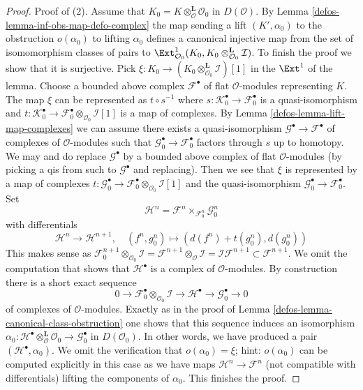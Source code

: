 \begin{proof}
\medskip\noindent
Proof of (2).
Assume that $K_0 = K \otimes_\mathcal{O}^\mathbf{L} \mathcal{O}_0$
in $D(\mathcal{O})$. By Lemma \ref{defos-lemma-inf-obs-map-defo-complex}
the map sending a lift $(K', \alpha_0)$ to the obstruction $o(\alpha_0)$
to lifting $\alpha_0$ defines a canonical injective map
from the set of isomomorphism classes of pairs
to $\Ext^1_{\mathcal{O}_0}(K_0,
K_0 \otimes_{\mathcal{O}_0}^\mathbf{L} \mathcal{I})$.
To finish the proof we show that it is surjective.
Pick $\xi : K_0 \to (K_0 \otimes_{\mathcal{O}_0}^\mathbf{L} \mathcal{I})[1]$
in the $\Ext^1$ of the lemma.
Choose a bounded above complex $\mathcal{F}^\bullet$
of flat $\mathcal{O}$-modules representing $K$.
The map $\xi$ can be represented as $t \circ s^{-1}$
where $s : \mathcal{K}_0^\bullet \to \mathcal{F}_0^\bullet$
is a quasi-isomorphism and
$t : \mathcal{K}_0^\bullet \to
\mathcal{F}_0^\bullet \otimes_{\mathcal{O}_0} \mathcal{I}[1]$
is a map of complexes.
By Lemma \ref{defos-lemma-lift-map-complexes}
we can assume there exists a quasi-isomorphism
$\mathcal{G}^\bullet \to \mathcal{F}^\bullet$
of complexes of $\mathcal{O}$-modules
such that $\mathcal{G}_0^\bullet \to \mathcal{F}_0^\bullet$
factors through $s$ up to homotopy.
We may and do replace $\mathcal{G}^\bullet$ by a bounded
above complex of flat $\mathcal{O}$-modules (by picking a qis
from such to $\mathcal{G}^\bullet$ and replacing).
Then we see that $\xi$ is represented by
a map of complexes
$t : \mathcal{G}_0^\bullet \to
\mathcal{F}_0^\bullet \otimes_{\mathcal{O}_0} \mathcal{I}[1]$
and the quasi-isomorphism $\mathcal{G}_0^\bullet \to \mathcal{F}_0^\bullet$.
Set
$$
\mathcal{H}^n = \mathcal{F}^n \times_{\mathcal{F}_0^n} \mathcal{G}_0^n
$$
with differentials
$$
\mathcal{H}^n \to \mathcal{H}^{n + 1},\quad
(f^n, g_0^n) \mapsto (d(f^n) + t(g_0^n), d(g_0^n))
$$
This makes sense as
$\mathcal{F}_0^{n + 1} \otimes_{\mathcal{O}_0} \mathcal{I} =
\mathcal{F}^{n + 1} \otimes_\mathcal{O} \mathcal{I} =
\mathcal{I}\mathcal{F}^{n + 1} \subset \mathcal{F}^{n + 1}$.
We omit the computation that shows that $\mathcal{H}^\bullet$
is a complex of $\mathcal{O}$-modules. By construction there is
a short exact sequence
$$
0 \to \mathcal{F}_0^\bullet \otimes_{\mathcal{O}_0} \mathcal{I} \to
\mathcal{H}^\bullet \to \mathcal{G}_0^\bullet \to 0
$$
of complexes of $\mathcal{O}$-modules.
Exactly as in the proof of Lemma \ref{defos-lemma-canonical-class-obstruction}
one shows that this sequence induces an isomorphism
$\alpha_0 :
\mathcal{H}^\bullet \otimes_\mathcal{O}^\mathbf{L} \mathcal{O}_0 \to
\mathcal{G}_0^\bullet$ in $D(\mathcal{O}_0)$.
In other words, we have produced a pair $(\mathcal{H}^\bullet, \alpha_0)$.
We omit the verification that $o(\alpha_0) = \xi$; hint: $o(\alpha_0)$
can be computed explicitly in this case as we have maps
$\mathcal{H}^n \to \mathcal{F}^n$ (not compatible with differentials)
lifting the components of $\alpha_0$. This finishes the proof.
\end{proof}



